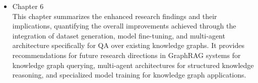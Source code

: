 \begin{itemize}
	\item Chapter 6 \kesimpulan \\
	    This chapter summarizes the enhanced research findings and their implications, quantifying the overall improvements achieved through the integration of dataset generation, model fine-tuning, and multi-agent architecture specifically for QA over existing knowledge graphs. It provides recommendations for future research directions in GraphRAG systems for knowledge graph querying, multi-agent architectures for structured knowledge reasoning, and specialized model training for knowledge graph applications.
\end{itemize}
